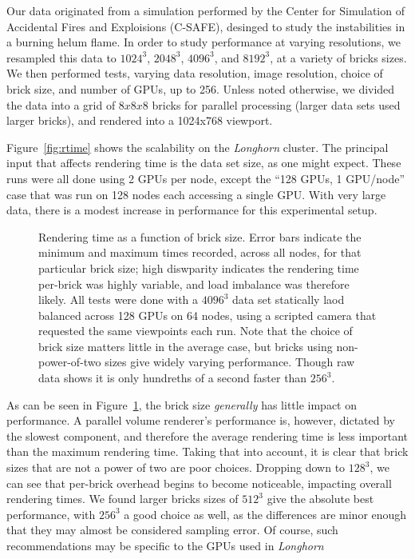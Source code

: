 Our data originated from a simulation performed by the Center for Simulation of
Accidental Fires and Exploisions (C-SAFE), desinged to study the instabilities
in a burning helum flame.  In order to study performance at varying
resolutions, we resampled this data to $1024^3$, $2048^3$, $4096^3$, and
$8192^3$, at a variety of bricks sizes.  We then performed tests, varying data
resolution, image resolution, choice of brick size, and number of GPUs, up to
256.  Unless noted otherwise, we divided the data into a grid of $8x8x8$ bricks
for parallel processing (larger data sets used larger bricks), and rendered
into a 1024x768 viewport.

Figure~\ref{fig:rtime} shows the scalability on the \textit{Longhorn}
cluster.  The principal input that affects rendering time is the data
set size, as one might expect.  These runs were all done using 2 GPUs
per node, except the ``128 GPUs, 1 GPU/node'' case that was run on 128
nodes each accessing a single GPU.  With very large data, there is a
modest increase in performance for this experimental setup.

\begin{figure}

  \caption{Rendering time as a function of brick size.  Error bars
  indicate the minimum and maximum times recorded, across all nodes,
  for that particular brick size; high diswparity indicates the
  rendering time per-brick was highly variable, and load imbalance
  was therefore likely.  All tests were done with a $4096^3$ data
  set statically laod balanced across 128 GPUs on 64 nodes, using a
  scripted camera that requested the same viewpoints each run.  Note
  that the choice of brick size matters little in the average case, but
  bricks using non-power-of-two sizes give widely varying performance.
  Though raw data shows it is only hundreths of a second faster than
  $256^3$.}
  \label{fig:bsize}
\end{figure}

As can be seen in Figure~\ref{fig:bsize}, the brick size
\emph{generally} has little impact on performance.  A parallel volume
renderer's performance is, however, dictated by the slowest component,
and therefore the average rendering time is less important than the
maximum rendering time.  Taking that into account, it is clear that
brick sizes that are not a power of two are poor choices.  Dropping
down to $128^3$, we can see that per-brick overhead begins to become
noticeable, impacting overall rendering times.  We found larger bricks
sizes of $512^3$ give the absolute best performance, with $256^3$ a
good choice as well, as the differences are minor enough that they may
almost be considered sampling error.  Of course, such recommendations
may be specific to the GPUs
used in \textit{Longhorn}

